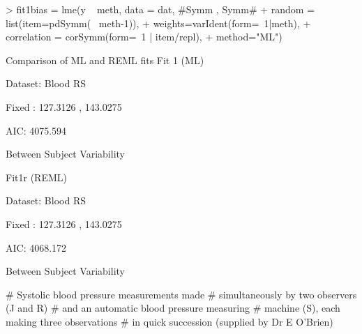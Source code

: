 > fit1bias = lme(y ~ meth, data = dat,   #Symm , Symm#
+     random = list(item=pdSymm(~ meth-1)), 
+     weights=varIdent(form=~1|meth),
+     correlation = corSymm(form=~1 | item/repl), 
+     method="ML")



 
 

Comparison of ML and REML fits
Fit 1 (ML)

Dataset: Blood RS

Fixed : 127.3126 , 143.0275

AIC: 4075.594

Between Subject Variability

 	Fit1r (REML)

Dataset: Blood RS

Fixed : 127.3126 , 143.0275

AIC: 4068.172

Between Subject Variability

 

 


# Systolic blood pressure measurements made 
# simultaneously by two observers (J and R) 
# and an automatic blood pressure measuring
# machine (S), each making three observations 
# in quick succession (supplied by Dr E O'Brien)

